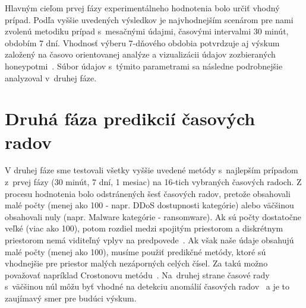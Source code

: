 \documentclass[thesismargins, thesislinespacing, openright, upjsfrontpage]{rnthesis}
\begin{document}
Hlavným cieľom prvej fázy experimentálneho hodnotenia bolo určiť vhodný prípad. Podľa vyššie uvedených výsledkov je najvhodnejším scenárom pre nami zvolenú metodiku prípad s~mesačnými údajmi, časovými intervalmi 30 minút, obdobím 7 dní. Vhodnosť výberu 7-dňového obdobia potvrdzuje aj výskum založený na časovo orientovanej analýze a vizualizácii údajov zozbieraných honeypotmi~\cite{sokol2015study}. Súbor údajov s~týmito parametrami sa následne podrobnejšie analyzoval v~druhej fáze.

\section{Druhá fáza predikcií časových radov}

V druhej fáze sme testovali všetky vyššie uvedené metódy s~najlepším prípadom z~prvej fázy (30 minút, 7 dní, 1 mesiac) na 16-tich vybraných časových radoch. Z procesu hodnotenia bolo odstránených šesť časových radov, pretože obsahovali malé počty (menej ako 100 - napr. DDoS dostupnosti kategórie) alebo väčšinou obsahovali nuly (napr. Malware kategórie - ransomware). Ak sú počty dostatočne veľké (viac ako 100), potom rozdiel medzi spojitým priestorom a diskrétnym priestorom nemá viditeľný vplyv na predpovede~\cite{hyndman2018forecasting}. Ak však naše údaje obsahujú malé počty (menej ako 100), musíme použiť predikčné metódy, ktoré sú vhodnejšie pre priestor malých nezáporných celých čísel. Za takú možno považovať napríklad Crostonovu metódu~\cite{Croston1972ForecastingAS, Christou2015}. Na~druhej strane časové rady s~väčšinou núl môžu byť vhodné na detekciu anomálií časových radov~\cite{mehrotra2017anomaly} a je to zaujímavý smer pre budúci výskum.
\end{document}
